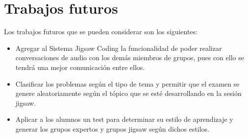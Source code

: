 \section{Trabajos futuros}
Los trabajos futuros que se pueden considerar son los siguientes:

\begin{itemize}
	\item Agregar al Sistema Jigsaw Coding la funcionalidad de poder realizar conversaciones de audio con los demás miembros de grupos, pues con ello se tendrá una mejor comunicación entre ellos.
	\item Clasificar los problemas según el tipo de tema y permitir que el examen se genere aleatoriamente según el tópico que se esté desarrollando en la sesión jigsaw.
	\item Aplicar a los alumnos un test para determinar su estilo de aprendizaje y generar los grupos expertos y grupos jigsaw según dichos estilos.
\end{itemize}